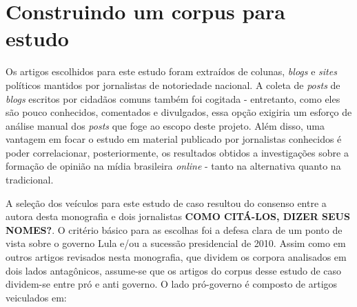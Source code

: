 

\section{Construindo um corpus para estudo}
\label{estudo:sec1}


Os artigos escolhidos para este estudo foram extraídos de colunas, \emph{blogs} e \emph{sites} políticos mantidos por jornalistas de notoriedade nacional. A coleta de \emph{posts} de \emph{blogs} escritos por cidadãos comuns também foi cogitada - entretanto, como eles são pouco conhecidos, comentados e divulgados, essa opção exigiria um esforço de análise manual dos \emph{posts} que foge ao escopo deste projeto. Além disso, uma vantagem em focar o estudo em material publicado por jornalistas conhecidos é poder correlacionar, posteriormente, os resultados obtidos a investigações sobre a formação de opinião na mídia brasileira \emph{online} - tanto na alternativa quanto na tradicional. 

A seleção dos veículos para este estudo de caso resultou do consenso entre a autora desta monografia e dois jornalistas \textbf{COMO CITÁ-LOS, DIZER SEUS NOMES?}. O critério básico para as escolhas foi a defesa clara de um ponto de vista sobre o governo Lula e/ou a sucessão presidencial de 2010. Assim como em outros artigos revisados nesta monografia, que dividem os corpora analisados em dois lados antagônicos, assume-se que os artigos do corpus desse estudo de caso dividem-se entre pró e anti governo. O lado pró-governo é composto de artigos veiculados em:




